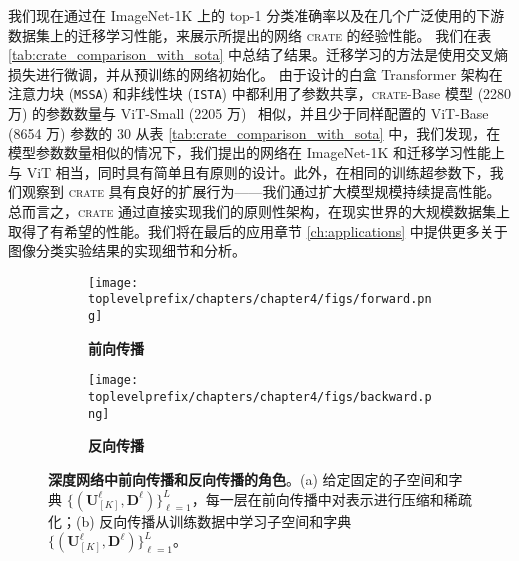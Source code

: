 \documentclass[../../book-main.tex]{subfiles}
\begin{document}
我们现在通过在 ImageNet-1K 上的 top-1 分类准确率以及在几个广泛使用的下游数据集上的迁移学习性能，来展示所提出的网络 \textsc{crate} 的经验性能。
我们在表 \ref{tab:crate_comparison_with_sota} 中总结了结果。迁移学习的方法是使用交叉熵损失进行微调，并从预训练的网络初始化。
由于设计的白盒 Transformer 架构在注意力块 (\texttt{MSSA}) 和非线性块 (\texttt{ISTA}) 中都利用了参数共享，\textsc{crate}{-Base} 模型 (2280 万)
的参数数量与 ViT-Small (2205 万)~\cite{dosovitskiy2020image} 相似，并且少于同样配置的 ViT-Base (8654 万) 参数的 30%
从表 \ref{tab:crate_comparison_with_sota} 中，我们发现，在模型参数数量相似的情况下，我们提出的网络在 ImageNet-1K 和迁移学习性能上与 ViT 相当，同时具有简单且有原则的设计。此外，在相同的训练超参数下，我们观察到 \textsc{crate} 具有良好的扩展行为——我们通过扩大模型规模持续提高性能。总而言之，\textsc{crate} 通过直接实现我们的原则性架构，在现实世界的大规模数据集上取得了有希望的性能。我们将在最后的应用章节 \ref{ch:applications} 中提供更多关于图像分类实验结果的实现细节和分析。

\begin{figure}[t]
    \begin{subfigure}[t]{0.48\textwidth}
        \centering
        \texttt{[image: \\toplevelprefix/chapters/chapter4/figs/forward.png]}
        \caption{\bf 前向传播}
    \end{subfigure}
    \hfill
    \begin{subfigure}[t]{0.48\textwidth}
        \centering
        \texttt{[image: \\toplevelprefix/chapters/chapter4/figs/backward.png]}
        \caption{\bf 反向传播}
    \end{subfigure}
    \caption{\small {\bf 深度网络中前向传播和反向传播的角色}。(a) 给定固定的子空间和字典 $\{(\bm U_{[K]}^{\ell}, \bm D^{\ell})\}_{\ell=1}^L$，每一层在前向传播中对表示进行压缩和稀疏化；(b) 反向传播从训练数据中学习子空间和字典 $\{(\bm U_{[K]}^{\ell}, \bm D^{\ell})\}_{\ell=1}^L$。}
    \label{fig:forward-backward}
\end{figure}
\end{document}

